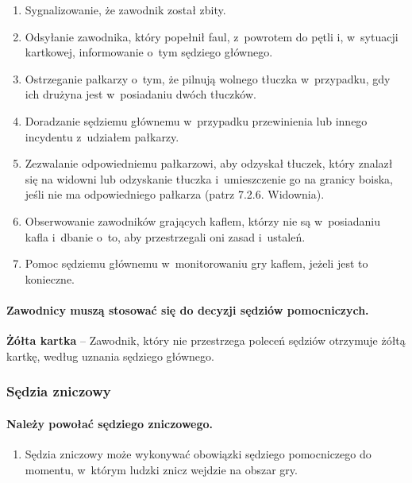 \documentclass[12pt]{article}
\newcommand\yellowcard[1]{\bgroup\textcolor{darkyellow}{\textbf{#1}}}
\begin{document}
\begin{enumerate}
	\item Sygnalizowanie, że zawodnik został zbity.

	\item Odsyłanie zawodnika, który popełnił faul, z~powrotem do pętli i, w~sytuacji kartkowej, informowanie o~tym sędziego głównego.

	\item Ostrzeganie pałkarzy o~tym, że pilnują wolnego tłuczka w~przypadku,
	      gdy ich drużyna jest w~posiadaniu dwóch tłuczków.

	\item Doradzanie sędziemu głównemu w~przypadku przewinienia lub innego
	      incydentu z~udziałem pałkarzy.

	\item Zezwalanie odpowiedniemu pałkarzowi, aby odzyskał tłuczek, który
	      znalazł się na widowni lub odzyskanie tłuczka i~umieszczenie go na
	      granicy boiska, jeśli nie ma odpowiedniego pałkarza (patrz 7.2.6.
	      Widownia).

	\item Obserwowanie zawodników grających kaflem, którzy nie są w~posiadaniu
	      kafla i~dbanie o~to, aby przestrzegali oni zasad i~ustaleń.

	\item Pomoc sędziemu głównemu w~monitorowaniu gry kaflem, jeżeli jest to
	      konieczne.
\end{enumerate}

\paragraph{Zawodnicy muszą stosować się do decyzji sędziów
	pomocniczych.}

\yellowcard{Żółta kartka} -- Zawodnik, który nie przestrzega poleceń sędziów
otrzymuje żółtą kartkę, według uznania sędziego głównego.

\subsubsection{Sędzia zniczowy}

\paragraph{Należy powołać sędziego zniczowego.}

\begin{enumerate}
	\item
	      Sędzia zniczowy może wykonywać obowiązki sędziego pomocniczego do
	      momentu, w~którym ludzki znicz wejdzie na obszar gry.
\end{enumerate}
\end{document}
